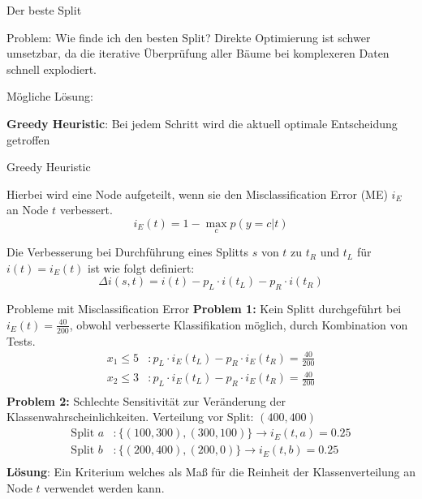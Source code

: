 \documentclass{beamer}
\begin{document}
\begin{frame}{Der beste Split}
	\begin{alertblock}{Problem: Wie finde ich den besten Split?}
		Direkte Optimierung ist schwer umsetzbar, da die iterative Überprüfung aller Bäume bei komplexeren Daten schnell explodiert.
		\\\vspace{0.5cm}
		
		
		Mögliche Lösung:\\ \vspace{0.5cm}
		
		
		\textbf{Greedy Heuristic}: Bei jedem Schritt wird die aktuell optimale Entscheidung getroffen
	
	\end{alertblock}
	
	\end{frame}
	
	
	\begin{frame}{Greedy Heuristic}
	
	Hierbei wird eine Node aufgeteilt, wenn sie den Misclassification Error (ME) $i_E$ an Node $t$ verbessert.
	   \[
		   i_E (t) = 1 - \max_c p(y = c | t)
	   \]
	
	Die Verbesserung bei Durchführung eines Splitts $s$ von $t$ zu $t_R$ und $t_L$ für $i(t) = i_E (t) $ ist wie folgt definiert: 
	\[
		\Delta i(s, t) = i(t) - p_L \cdot i(t_L) - p_R \cdot i(t_R)
	\]	
	
	\end{frame}
	\begin{frame}{Probleme mit Misclassification Error}
	\textbf{Problem 1:} Kein Splitt durchgeführt bei $i_E (t) = \frac{40}{200}$, obwohl verbesserte Klassifikation möglich, durch Kombination von Tests.
	 \begin{align*}
		 x_1 \leq 5&: p_L \cdot i_E (t_L) - p_R \cdot i_E (t_R) = \frac{40}{200} \\
		x_2 \leq 3&: p_L \cdot i_E (t_L) - p_R \cdot i_E (t_R) = \frac{40}{200} \\
	 \end{align*}
	\textbf{Problem 2:}
	Schlechte Sensitivität zur Veränderung der Klassenwahrscheinlichkeiten.
	Verteilung vor Split: $(400, 400)$
	 \begin{align*}
		 \text{Split } a &: \{(100,300), (300,100)\} \rightarrow i_E (t, a) = 0.25 \\
		\text{Split } b &: \{(200,400), (200,0)\} \rightarrow i_E (t, b) = 0.25 \\
	 \end{align*}
	 \textbf{Lösung}: Ein Kriterium welches als Maß für die Reinheit der Klassenverteilung an Node $t$ verwendet werden kann.
	\end{frame}
	
\end{document}
